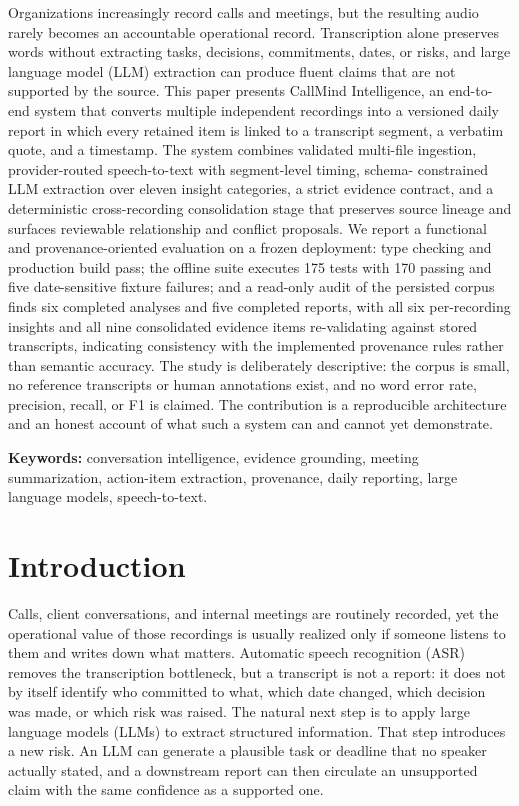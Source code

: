\documentclass[10pt,a4paper]{article}
\begin{document}
Organizations increasingly record calls and meetings, but the resulting audio rarely
becomes an accountable operational record. Transcription alone preserves words without
extracting tasks, decisions, commitments, dates, or risks, and large language model (LLM)
extraction can produce fluent claims that are not supported by the source. This paper
presents CallMind Intelligence, an end-to-end system that converts multiple independent
recordings into a versioned daily report in which every retained item is linked to a
transcript segment, a verbatim quote, and a timestamp. The system combines validated
multi-file ingestion, provider-routed speech-to-text with segment-level timing, schema-
constrained LLM extraction over eleven insight categories, a strict evidence contract, and
a deterministic cross-recording consolidation stage that preserves source lineage and
surfaces reviewable relationship and conflict proposals. We report a functional and
provenance-oriented evaluation on a frozen deployment: type checking and production build
pass; the offline suite executes 175 tests with 170 passing and five date-sensitive
fixture failures; and a read-only audit of the persisted corpus finds six completed
analyses and five completed reports, with all six per-recording insights and all nine
consolidated evidence items re-validating against stored transcripts, indicating
consistency with the implemented provenance rules rather than semantic accuracy. The study is
deliberately descriptive: the corpus is small, no reference transcripts or human
annotations exist, and no word error rate, precision, recall, or F1 is claimed. The
contribution is a reproducible architecture and an honest account of what such a system
can and cannot yet demonstrate.

\noindent\textbf{Keywords:} conversation intelligence, evidence grounding, meeting summarization, action-item extraction, provenance, daily reporting, large language models, speech-to-text.

\section{Introduction}

Calls, client conversations, and internal meetings are routinely recorded, yet the
operational value of those recordings is usually realized only if someone listens to them
and writes down what matters. Automatic speech recognition (ASR) removes the transcription
bottleneck, but a transcript is not a report: it does not by itself identify who committed
to what, which date changed, which decision was made, or which risk was raised. The
natural next step is to apply large language models (LLMs) to extract structured
information. That step introduces a new risk. An LLM can generate a plausible task or
deadline that no speaker actually stated, and a downstream report can then circulate an
unsupported claim with the same confidence as a supported one.
\end{document}
